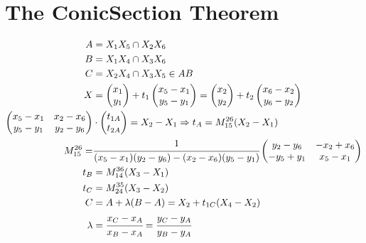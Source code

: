 \documentclass[12pt]{article}
\begin{document}


\section{The ConicSection Theorem}

\begin{align}
A &= X_1 X_5 \cap X_2 X_6 \\
B &= X_1 X_4 \cap X_3 X_6 \\
C &= X_2 X_4 \cap X_3 X_5 \in AB \\
X &= \begin{pmatrix}
    x_1 \\ y_1
\end{pmatrix} + t_1 \begin{pmatrix}
    x_5 - x_1 \\
    y_5 - y_1
\end{pmatrix} = \begin{pmatrix}
    x_2 \\ y_2
\end{pmatrix} + t_2 \begin{pmatrix}
    x_6 - x_2 \\
    y_6 - y_2
\end{pmatrix} \\
\begin{pmatrix}
    x_5 - x_1 & x_2 - x_6 \\
    y_5 - y_1 & y_2 - y_6
\end{pmatrix} &\cdot \begin{pmatrix}
    t_{1A} \\
    t_{2A}
\end{pmatrix} = X_2 - X_1 \Rightarrow t_A = M_{15}^{26} (X_2 - X_1)\\
M_{15}^{26} = &\cfrac{1}{(x_5 - x_1)(y_2 - y_6) - (x_2 - x_6)(y_5 - y_1)} \begin{pmatrix}
    y_2 - y_6 & -x_2 + x_6 \\
    -y_5 + y_1 & x_5 - x_1
\end{pmatrix} \\
t_B &= M_{14}^{36} (X_3 - X_1)\\
t_C &= M_{24}^{35} (X_3 - X_2) \\
C &= A + \lambda (B - A) = X_2 + t_{1C} (X_4 - X_2) \\
\lambda &= \cfrac{x_C - x_A}{x_B - x_A} = \cfrac{y_C - y_A}{y_B - y_A}
\end{align}
\end{document}
